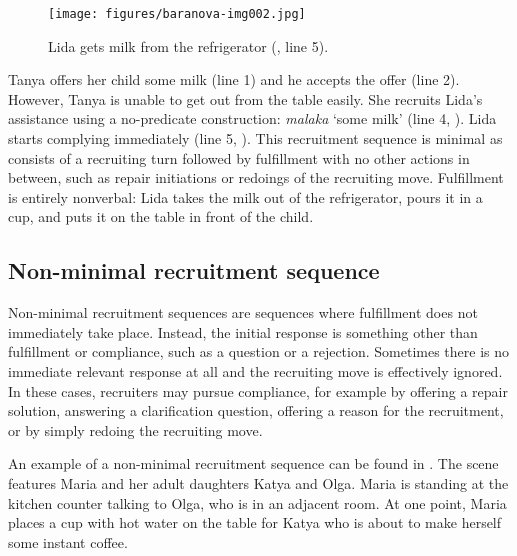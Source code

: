 \documentclass[output=paper,modfonts,nonflat]{langsci/langscibook}
\begin{document}
\begin{figure}
\caption{Lida gets milk from the refrigerator (, line 5).}
\label{fig:baranova:2}
\texttt{[image: figures/baranova-img002.jpg]}
\end{figure}

Tanya offers her child some milk (line 1) and he accepts the offer (line 2). However, Tanya is unable to get out from the table easily. She recruits Lida’s assistance using a no-predicate construction: \textit{malaka} ‘some milk’ (line 4, ). Lida starts complying immediately (line 5, ). This recruitment sequence is minimal as consists of a recruiting turn followed by fulfillment with no other actions in between, such as repair initiations or redoings of the recruiting move. Fulfillment is entirely nonverbal: Lida takes the milk out of the refrigerator, pours it in a cup, and puts it on the table in front of the child.

\subsection{Non-minimal recruitment sequence}

Non-minimal recruitment sequences are sequences where fulfillment does not immediately take place. Instead, the initial response is something other than fulfillment or compliance, such as a question or a rejection. Sometimes there is no immediate relevant response at all and the recruiting move is effectively ignored. In these cases, recruiters may pursue compliance, for example by offering a repair solution, answering a clarification question, offering a reason for the recruitment, or by simply redoing the recruiting move.

An example of a non-minimal recruitment sequence can be found in . The scene features Maria and her adult daughters Katya and Olga. Maria is standing at the kitchen counter talking to Olga, who is in an adjacent room. At one point, Maria places a cup with hot water on the table for Katya who is about to make herself some instant coffee.
\end{document}
